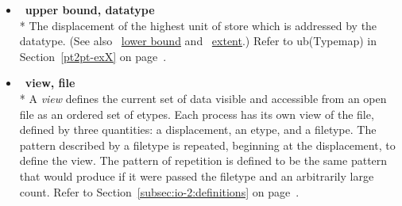 \begin{itemize}
\label{glossary:upper_bound_datatype}
\item  ~\hypertarget{glossary:upper_bound_datatype}{\textbf{upper bound, datatype}} \\*
The displacement of the highest unit of store which is addressed by the datatype. 
(See also ~\hyperlink{glossary:lower_bound}{lower bound} and ~\hyperlink{glossary:extent}{extent}.)
Refer to ub(Typemap) in Section~\ref{pt2pt-exX} on page~\pageref{pt2pt-exX}.

\label{glossary:view_file}
\item  ~\hypertarget{glossary:view_file}{\textbf{view, file}} \\*
A {\it view} defines the current set of data visible
and accessible from an open file as an ordered set of etypes.
Each process has its own view of the file,
defined by three quantities:
a displacement, an etype, and a filetype.
The pattern described by a filetype is repeated,
beginning at the displacement, to define the view.
The pattern of repetition is defined to be the same pattern
that  would produce if it were passed
the filetype and an arbitrarily large count.
Refer to Section~\ref{subsec:io-2:definitions} on page~\pageref{subsec:io-2:definitions}.


\end{itemize}
